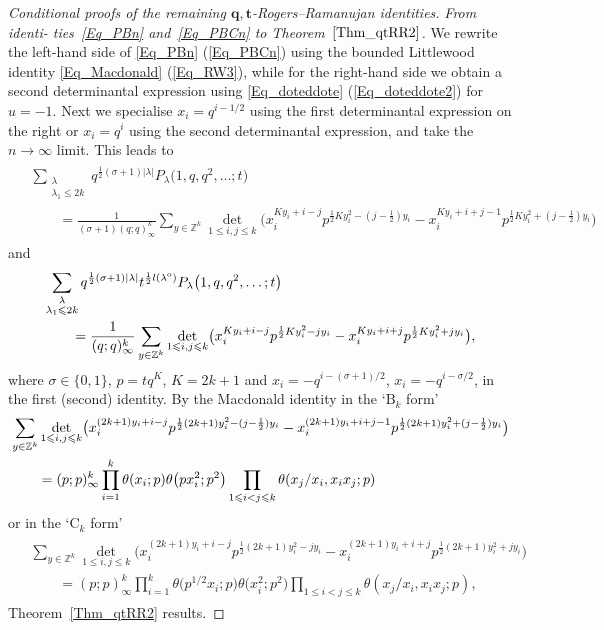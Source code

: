 \documentclass[pdftex]{sigma}
\numberwithin{equation}{section}
\renewcommand{\leq}{\leqslant}
\newcommand{\abs}[1]{\vert#1\vert}
\newcommand{\la}{\lambda}
\begin{document}
\begin{proof}[Conditional proofs of the remaining $\boldsymbol{q,t}$-Rogers--Ramanujan
identities]
{\it From identi- \linebreak ties~\eqref{Eq_PBn}  and~\eqref{Eq_PBCn} to Theorem~$\ref{Thm_qtRR2}$.}
We rewrite the left-hand side of \eqref{Eq_PBn} (\eqref{Eq_PBCn})
using the bounded Littlewood identity \eqref{Eq_Macdonald}
(\eqref{Eq_RW3}), while for the right-hand side we obtain a second
determinantal expression using \eqref{Eq_doteddote} (\eqref{Eq_doteddote2})
for $u=-1$.
Next we specialise $x_i=q^{i-1/2}$ using the first determinantal
expression on the right or $x_i=q^i$ using the second determinantal
expression, and take the $n\to\infty$ limit.
This leads to
\begin{align*}
\begin{split}
&\sum_{\substack{\la \\[1pt] \la_1\leq 2k}}
q^{\frac{1}{2}(\sigma+1)\abs{\la}}P_{\la}\bigl(1,q,q^2,\dots;t\bigr) \\
&\qquad = \frac{1}{(\sigma+1)(q;q)_{\infty}^k} \sum_{y\in\mathbb{Z}^k}
\det_{1\leq i,j\leq k}\bigl(
x_i^{Ky_i+i-j} p^{\frac{1}{2}Ky_i^2-(j-\frac{1}{2})y_i}-
x_i^{Ky_i+i+j-1} p^{\frac{1}{2}Ky_i^2+(j-\frac{1}{2})y_i}\bigr)
\end{split}
\end{align*}
and
\begin{align*}
&\sum_{\substack{\la \\[1pt] \la_1\leq 2k}}
q^{\frac{1}{2}(\sigma+1)\abs{\la}}t^{\frac{1}{2}l(\la^{\textup{o}})}
P_{\la}\bigl(1,q,q^2,\dots;t\bigr) \\
&\qquad = \frac{1}{(q;q)_{\infty}^k} \sum_{y\in\mathbb{Z}^k}
\det_{1\leq i,j\leq k}\bigl(
x_i^{Ky_i+i-j} p^{\frac{1}{2}Ky_i^2-jy_i}-
x_i^{Ky_i+i+j} p^{\frac{1}{2}Ky_i^2+jy_i}\bigr),
\end{align*}
where $\sigma\in\{0,1\}$, $p=tq^K$, $K=2k+1$ and
$x_i=-q^{i-(\sigma+1)/2}$, $x_i=-q^{i-\sigma/2}$, in the first
(second) identity.
By the  Macdonald identity \cite{Macdonald72}
in the `$\mathrm{B}_k$ form'
\begin{align}
&\sum_{y\in\mathbb{Z}^k}
\det_{1\leq i,j\leq k}\bigl(
x_i^{(2k+1)y_i+i-j} p^{\frac{1}{2}(2k+1)y_i^2-(j-\frac{1}{2})y_i}
-x_i^{(2k+1)y_i+i+j-1} p^{\frac{1}{2}(2k+1)y_i^2+(j-\frac{1}{2})y_i}\bigr)
\notag \\
&\qquad=(p;p)_{\infty}^k\prod_{i=1}^k \theta(x_i;p)\theta\bigl(px_i^2;p^2\bigr)
\prod_{1\leq i<j\leq k} \theta(x_j/x_i,x_ix_j;p) \label{Eq_MacA2k2}
\end{align}
or in the `$\mathrm{C}_k$ form'
\begin{align*}
\begin{split}
&\sum_{y\in\mathbb{Z}^k}
\det_{1\leq i,j\leq k}\bigl(
x_i^{(2k+1)y_i+i-j} p^{\frac{1}{2}(2k+1)y_i^2-jy_i}
-x_i^{(2k+1)y_i+i+j} p^{\frac{1}{2}(2k+1)y_i^2+jy_i}\bigr) \\
&\qquad=(p;p)_{\infty}^k\prod_{i=1}^k
\theta\bigl(p^{1/2}x_i;p\bigr)\theta\bigl(x_i^2;p^2\bigr)
\prod_{1\leq i<j\leq k} \theta(x_j/x_i,x_ix_j;p),
\end{split}
\end{align*}
Theorem~\ref{Thm_qtRR2} results.


\end{proof}
\end{document}
